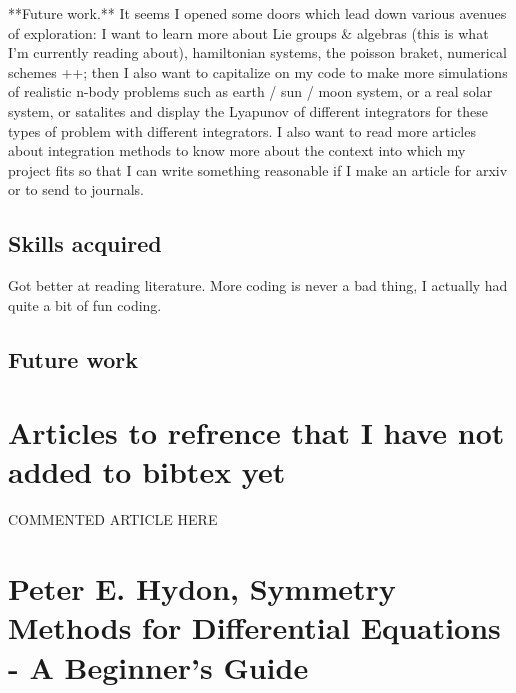 \documentclass[12pt]{article}
\begin{document}
**Future work.**
It seems I opened some doors which lead down various avenues of exploration: I want to learn more about Lie groups \& algebras (this is what I'm currently reading about), hamiltonian systems, the poisson braket, numerical schemes ++; then I also want to capitalize on my code to make more simulations of realistic n-body problems such as earth / sun / moon system, or a real solar system, or satalites and display the Lyapunov of different integrators for these types of problem with different integrators. I also want to read more articles about integration methods to know more about the context into which my project fits so that I can write something reasonable if I make an article for arxiv or to send to journals.

\subsection{Skills acquired}
Got better at reading literature. More coding is never a bad thing, I actually had quite a bit of fun coding.


\subsection{Future work}




\section{Articles to refrence that I have not added to bibtex yet}
COMMENTED ARTICLE HERE





\newpage
\appendix

\section{Peter E. Hydon, Symmetry Methods for Differential Equations - A Beginner's Guide}
\end{document}
